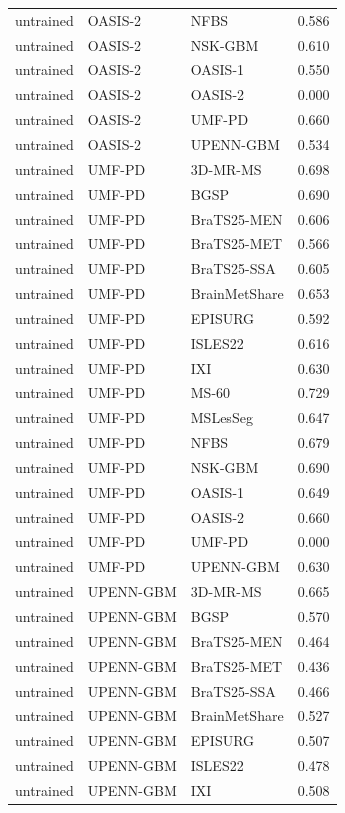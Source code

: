 \begin{tabular}{lllr}
untrained & OASIS-2 & NFBS & 0.586 \\
untrained & OASIS-2 & NSK-GBM & 0.610 \\
untrained & OASIS-2 & OASIS-1 & 0.550 \\
untrained & OASIS-2 & OASIS-2 & 0.000 \\
untrained & OASIS-2 & UMF-PD & 0.660 \\
untrained & OASIS-2 & UPENN-GBM & 0.534 \\
untrained & UMF-PD & 3D-MR-MS & 0.698 \\
untrained & UMF-PD & BGSP & 0.690 \\
untrained & UMF-PD & BraTS25-MEN & 0.606 \\
untrained & UMF-PD & BraTS25-MET & 0.566 \\
untrained & UMF-PD & BraTS25-SSA & 0.605 \\
untrained & UMF-PD & BrainMetShare & 0.653 \\
untrained & UMF-PD & EPISURG & 0.592 \\
untrained & UMF-PD & ISLES22 & 0.616 \\
untrained & UMF-PD & IXI & 0.630 \\
untrained & UMF-PD & MS-60 & 0.729 \\
untrained & UMF-PD & MSLesSeg & 0.647 \\
untrained & UMF-PD & NFBS & 0.679 \\
untrained & UMF-PD & NSK-GBM & 0.690 \\
untrained & UMF-PD & OASIS-1 & 0.649 \\
untrained & UMF-PD & OASIS-2 & 0.660 \\
untrained & UMF-PD & UMF-PD & 0.000 \\
untrained & UMF-PD & UPENN-GBM & 0.630 \\
untrained & UPENN-GBM & 3D-MR-MS & 0.665 \\
untrained & UPENN-GBM & BGSP & 0.570 \\
untrained & UPENN-GBM & BraTS25-MEN & 0.464 \\
untrained & UPENN-GBM & BraTS25-MET & 0.436 \\
untrained & UPENN-GBM & BraTS25-SSA & 0.466 \\
untrained & UPENN-GBM & BrainMetShare & 0.527 \\
untrained & UPENN-GBM & EPISURG & 0.507 \\
untrained & UPENN-GBM & ISLES22 & 0.478 \\
untrained & UPENN-GBM & IXI & 0.508 \\

\end{tabular}
